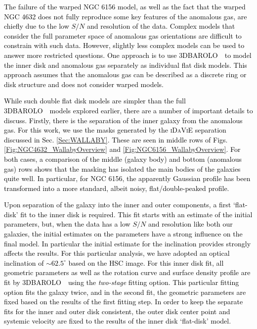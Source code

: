 \documentclass[fleqn,usenatbib]{mnras}
\newcommand{\barolo}{\textsc{3DBAROLO}~}
\begin{document}
\textcolor{black}{The failure of the warped NGC 6156 model, as well as the fact that the warped NGC 4632 does not fully reproduce some key features of the anomalous gas, are chiefly due to the low $S/N$ and resolution of the data.  Complex models that consider the full parameter space of anomalous gas orientations are difficult to constrain with such data.  However, slightly less complex models can be used to answer more restricted questions.  One approach is to use \barolo\ to model the inner disk and anomalous gas separately as individual flat disk models.  This approach assumes that the anomalous gas can be described as a discrete ring or disk structure and does not consider warped models.}

\textcolor{black}{While such double flat disk models are simpler than the full \barolo\ models explored earlier, there are a number of important details to discuss.  Firstly, there is the separation of the inner galaxy from the anomalous gas.  For this work, we use the masks generated by the \textsc{iDaViE} separation discussed in Sec. \ref{Sec:WALLABY}.  These are seen in middle rows of Figs. \ref{Fig:NGC4632_WallabyOverview} and \ref{Fig:NGC6156_WallabyOverview}.  For both cases, a comparison of the middle (galaxy body) and bottom (anomalous gas) rows shows that the masking has isolated the main bodies of the galaxies quite well.  In particular, for NGC 6156, the apparently Gaussian profile has been transformed into a more standard, albeit noisy, flat/double-peaked profile.}

\textcolor{black}{Upon separation of the galaxy into the inner and outer components, a first `flat-disk' fit to the inner disk is required. This fit starts with an estimate of the initial parameters, but, when the data has a low $S/N$ and resolution like both our galaxies, the initial estimates on the parameters have a strong influence on the final model.  In particular the initial estimate for the inclination provides strongly affects the results.  For this particular analysis, we have adopted an optical inclination of $\sim62.5^{\circ}$ based on the HSC image.  For this inner disk fit, all geometric parameters as well as the rotation curve and surface density profile are fit by \barolo\ using the \textit{two-stage} fitting option.  This particular fitting option fits the galaxy twice, and in the second fit, the geometric parameters are fixed based on the results of the first fitting step.  In order to keep the separate fits for the inner and outer disk consistent, the outer disk center point and systemic velocity are fixed to the results of the inner disk `flat-disk' model.}
\end{document}
